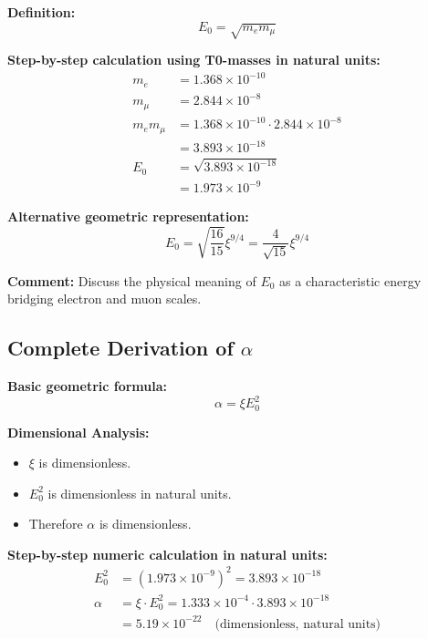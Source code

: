 \documentclass[12pt,a4paper]{article}
\newcommand{\xipar}{\xi}            %
\newcommand{\alphagem}{\alpha}      %
\newcommand{\Ezero}{E_0}            %
\begin{document}
\textbf{Definition:}
\begin{equation}
	\Ezero = \sqrt{m_e m_\mu}
\end{equation}

\textbf{Step-by-step calculation using T0-masses in natural units:}
\begin{align}
	m_e &= 1.368 \times 10^{-10} \\
	m_\mu &= 2.844 \times 10^{-8} \\
	m_e m_\mu &= 1.368 \times 10^{-10} \cdot 2.844 \times 10^{-8} \\
	&= 3.893 \times 10^{-18} \\
	\Ezero &= \sqrt{3.893 \times 10^{-18}} \\
	&= 1.973 \times 10^{-9}
\end{align}

\textbf{Alternative geometric representation:}
\begin{equation}
	\Ezero = \sqrt{\frac{16}{15}} \xipar^{9/4} = \frac{4}{\sqrt{15}} \xipar^{9/4}
\end{equation}

\textbf{Comment:} Discuss the physical meaning of $\Ezero$ as a characteristic energy bridging electron and muon scales.

\subsection{Complete Derivation of $\alphagem$}

\textbf{Basic geometric formula:}
\begin{equation}
	\alphagem = \xipar \Ezero^2
\end{equation}

\textbf{Dimensional Analysis:}
\begin{itemize}
	\item $\xipar$ is dimensionless.
	\item $\Ezero^2$ is dimensionless in natural units.
	\item Therefore $\alphagem$ is dimensionless.
\end{itemize}

\textbf{Step-by-step numeric calculation in natural units:}
\begin{align}
	\Ezero^2 &= (1.973 \times 10^{-9})^2 = 3.893 \times 10^{-18} \\
	\alphagem &= \xipar \cdot \Ezero^2 = 1.333 \times 10^{-4} \cdot 3.893 \times 10^{-18} \\
	&= 5.19 \times 10^{-22} \quad \text{(dimensionless, natural units)}
\end{align}
\end{document}
